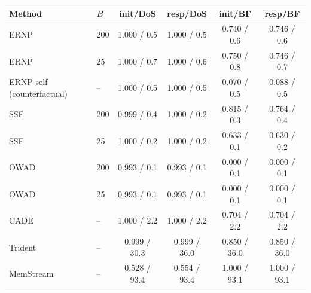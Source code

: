\begin{tabular}{llcccc}
\toprule
Method & $B$ & init/DoS & resp/DoS & init/BF & resp/BF\\
\midrule
ERNP & 200 & 1.000 / 0.5 & 1.000 / 0.5 & 0.740 / 0.6 & 0.746 / 0.6\\
ERNP & 25 & 1.000 / 0.7 & 1.000 / 0.6 & 0.750 / 0.8 & 0.746 / 0.7\\
ERNP-self (counterfactual) & -- & 1.000 / 0.5 & 1.000 / 0.5 & 0.070 / 0.5 & 0.088 / 0.5\\
SSF & 200 & 0.999 / 0.4 & 1.000 / 0.2 & 0.815 / 0.3 & 0.764 / 0.4\\
SSF & 25 & 1.000 / 0.2 & 1.000 / 0.2 & 0.633 / 0.1 & 0.630 / 0.2\\
OWAD & 200 & 0.993 / 0.1 & 0.993 / 0.1 & 0.000 / 0.1 & 0.000 / 0.1\\
OWAD & 25 & 0.993 / 0.1 & 0.993 / 0.1 & 0.000 / 0.1 & 0.000 / 0.1\\
CADE & -- & 1.000 / 2.2 & 1.000 / 2.2 & 0.704 / 2.2 & 0.704 / 2.2\\
Trident & -- & 0.999 / 30.3 & 0.999 / 36.0 & 0.850 / 36.0 & 0.850 / 36.0\\
MemStream & -- & 0.528 / 93.4 & 0.554 / 93.4 & 1.000 / 93.1 & 1.000 / 93.1\\
\bottomrule
\end{tabular}
